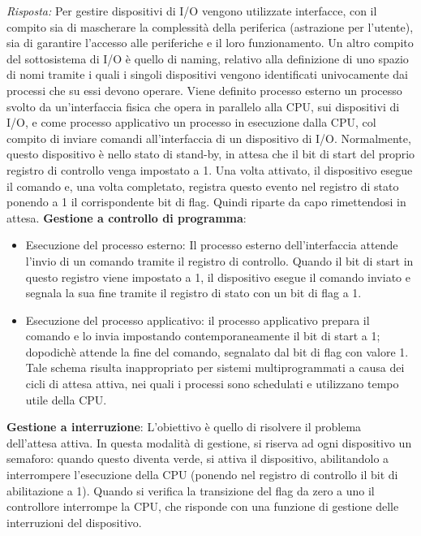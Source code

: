 \documentclass{article}
\newenvironment{solution}
    {\textit{Risposta:}}
    {}
\begin{document}
\begin{solution}
Per gestire dispositivi di I/O vengono utilizzate interfacce, con il compito sia di mascherare la complessità della periferica (astrazione per l’utente), sia di garantire l’accesso alle periferiche e il loro funzionamento. 
Un altro compito del sottosistema di I/O è quello di naming, relativo alla definizione di uno spazio di nomi tramite i quali i singoli dispositivi vengono identificati univocamente dai processi che su essi devono operare.
\newline
Viene definito processo esterno un processo svolto da un’interfaccia fisica che opera in parallelo alla CPU, sui dispositivi di I/O, e come processo applicativo un processo in esecuzione dalla CPU, col compito di inviare comandi all’interfaccia di un dispositivo di I/O.
\newline
Normalmente, questo dispositivo è nello stato di stand-by, in attesa che il bit di start del proprio registro di controllo venga impostato a 1.
\newline
Una volta attivato, il dispositivo esegue il comando e, una volta completato, registra questo evento nel registro di stato ponendo a 1 il corrispondente bit di flag. Quindi riparte da capo rimettendosi in attesa.
\newline
\newline
\textbf{Gestione a controllo di programma}:
\begin{itemize}
    \item Esecuzione del processo esterno: Il processo esterno dell’interfaccia attende l’invio di un comando tramite il registro di controllo. Quando il bit di start in questo registro viene impostato a 1, il dispositivo esegue il comando inviato e segnala la sua fine tramite il registro di stato con un bit di flag a 1.
    \item Esecuzione del processo applicativo: il processo applicativo prepara il comando e lo invia impostando contemporaneamente il bit di start a 1; dopodichè attende la fine del comando, segnalato dal bit di flag con valore 1.
    \newline
    Tale schema risulta inappropriato per sistemi multiprogrammati a causa dei cicli di attesa attiva, nei quali i processi sono schedulati e utilizzano tempo utile della CPU.
\end{itemize}
\textbf{Gestione a interruzione}:
\newline
L’obiettivo è quello di risolvere il problema dell’attesa attiva.
\newline
In questa modalità di gestione, si riserva ad ogni dispositivo un semaforo: quando questo diventa verde, si attiva il dispositivo, abilitandolo a interrompere l’esecuzione della CPU (ponendo nel registro di controllo il bit di abilitazione a 1).
\newline
Quando si verifica la transizione del flag da zero a uno il controllore interrompe la CPU, che risponde con una funzione di gestione delle interruzioni del dispositivo.
\end{solution}
\end{document}
